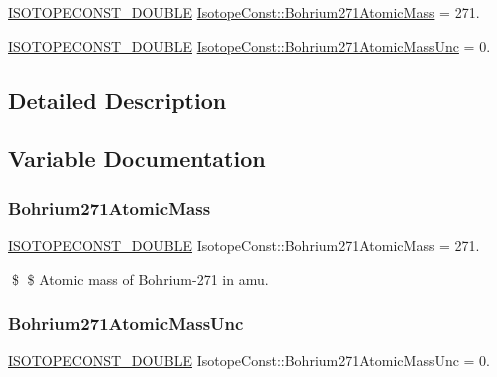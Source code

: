 \begin{DoxyCompactItemize}
\item 
\mbox{\hyperlink{group___isotope_const-_macros_ga8f45a7272ce02c0b4c65c44636ed719a}{I\+S\+O\+T\+O\+P\+E\+C\+O\+N\+S\+T\+\_\+\+D\+O\+U\+B\+LE}} \mbox{\hyperlink{group___isotope_const-_bohrium-_bh271_ga1e59c4c8ee54a6d558c17d6e8bb0f537}{Isotope\+Const\+::\+Bohrium271\+Atomic\+Mass}} = 271.
\item 
\mbox{\hyperlink{group___isotope_const-_macros_ga8f45a7272ce02c0b4c65c44636ed719a}{I\+S\+O\+T\+O\+P\+E\+C\+O\+N\+S\+T\+\_\+\+D\+O\+U\+B\+LE}} \mbox{\hyperlink{group___isotope_const-_bohrium-_bh271_gad99f94563f5be79f034af7d4db6e41d4}{Isotope\+Const\+::\+Bohrium271\+Atomic\+Mass\+Unc}} = 0.
\end{DoxyCompactItemize}


\subsection{Detailed Description}


\subsection{Variable Documentation}
\mbox{\label{group___isotope_const-_bohrium-_bh271_ga1e59c4c8ee54a6d558c17d6e8bb0f537}} 
\subsubsection{\texorpdfstring{Bohrium271\+Atomic\+Mass}{Bohrium271AtomicMass}}
{\footnotesize\ttfamily \mbox{\hyperlink{group___isotope_const-_macros_ga8f45a7272ce02c0b4c65c44636ed719a}{I\+S\+O\+T\+O\+P\+E\+C\+O\+N\+S\+T\+\_\+\+D\+O\+U\+B\+LE}} Isotope\+Const\+::\+Bohrium271\+Atomic\+Mass = 271.}

\$ \$ Atomic mass of Bohrium-\/271 in amu. \mbox{\label{group___isotope_const-_bohrium-_bh271_gad99f94563f5be79f034af7d4db6e41d4}} 
\subsubsection{\texorpdfstring{Bohrium271\+Atomic\+Mass\+Unc}{Bohrium271AtomicMassUnc}}
{\footnotesize\ttfamily \mbox{\hyperlink{group___isotope_const-_macros_ga8f45a7272ce02c0b4c65c44636ed719a}{I\+S\+O\+T\+O\+P\+E\+C\+O\+N\+S\+T\+\_\+\+D\+O\+U\+B\+LE}} Isotope\+Const\+::\+Bohrium271\+Atomic\+Mass\+Unc = 0.}

